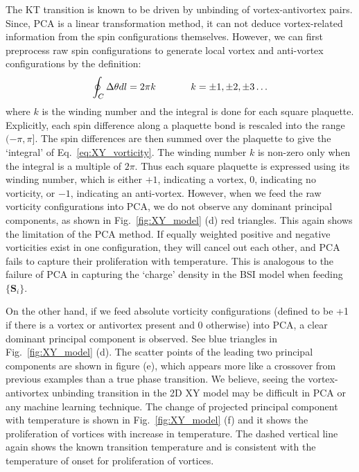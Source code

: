 \documentclass[pra,letterpaper,10pt,twocolumn]{revtex4}
\begin{document}
The KT transition is known to be driven by unbinding of
vortex-antivortex pairs. Since, PCA is a linear transformation method, it
can not deduce vortex-related information from the spin configurations themselves.
However, we can first preprocess raw spin
configurations to generate local vortex and anti-vortex configurations
by the definition:
\begin{align}
\oint_C \Delta \theta dl = 2\pi k \hskip0.50in 
k=\pm 1, \pm 2, \pm3 \dots
\label{eq:XY_vorticity}
\end{align}
where $k$ is the winding number and the integral is done for each square
plaquette. Explicitly, each spin difference along a plaquette bond is rescaled into
the range $(-\pi, \pi]$.  The spin differences are then summed over the plaquette
to give the `integral' of Eq.~\ref{eq:XY_vorticity}.  The winding number
$k$ is non-zero only when the integral is a multiple of $2\pi$. Thus
each square plaquette is expressed using its winding number, which is
either $+1$, indicating a vortex, $0$, indicating no vorticity, or $-1$,
indicating an anti-vortex.  However, when we feed the raw vorticity
configurations into PCA, we do not observe any dominant principal
components, as shown in Fig.~\ref{fig:XY_model} (d) red triangles. This
again shows the limitation of the PCA method.  If equally weighted
positive and negative vorticities exist in one configuration, they will
cancel out each other, and PCA fails to capture their proliferation with
temperature.  This is analogous to the failure of PCA in capturing the
`charge' density in the BSI model when feeding $\{\mathbf{S}_i\}$.

On the other hand, if we feed absolute vorticity configurations (defined
to be +1 if there is a vortex or antivortex present and 0 otherwise)
into PCA, a clear dominant principal component is observed. See blue
triangles in Fig.~\ref{fig:XY_model} (d). The scatter points of the
leading two principal components are shown in figure (e), which appears
more like a crossover from previous examples than a true phase
transition. We believe, seeing the vortex-antivortex unbinding
transition in the 2D XY model may be difficult in PCA or any machine
learning technique.  The change of projected principal component with
temperature is shown in Fig.~\ref{fig:XY_model} (f) and it shows the
proliferation of vortices with increase in temperature. The dashed
vertical line again shows the known transition temperature and is
consistent with the temperature of onset for proliferation of vortices.
\end{document}
